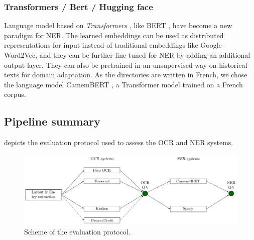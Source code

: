 

\subsubsection{Transformers / Bert / Hugging face}
Language model based on \textit{Transformers} \cite{vaswani2017attention}, like BERT \cite{devlin2018bert}, have become a new paradigm for NER\cite{li2020}. 
The learned embeddings can be used as distributed representations for input instead of traditional embeddings like Google Word2Vec, and they can be further fine-tuned for NER by adding an additional output layer. 
They can also be pretrained in an unsupervised way on historical texts for domain adaptation.
As the directories are written in French, we chose the language model CamemBERT \cite{martin-etal-2020-camembert}, a Transformer model trained on a French corpus.

\subsection{Pipeline summary}

 depicts the evaluation protocol used to assess the OCR and NER systems. 

\begin{figure}[tb]
    \includegraphics[width=\linewidth]{figs/protocol.pdf}
    \caption{Scheme of the evaluation protocol. }
    \label{fig.protocol}
    \end{figure}


